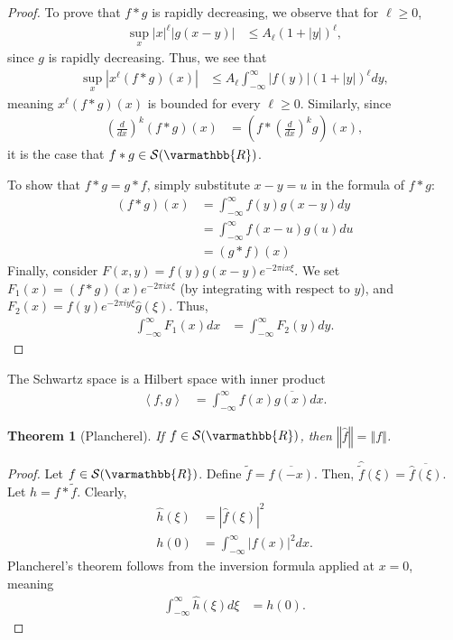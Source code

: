 \documentclass[12pt]{extarticle}
\newcommand{\R}{\varmathbb{R}}
\newcommand{\iprod}[2]{\left\langle #1,#2\right\rangle}
\newcommand{\norm}[1]{\left\Vert #1\right\Vert}
\theoremstyle{plain}
\newtheorem*{theorem}{Theorem}%
\theoremstyle{definition}
\theoremstyle{remark}
\renewcommand{\newline}{\hfill\break}
\begin{document}
  \begin{proof}
  To prove that $f\ast g$ is rapidly decreasing, we observe that for $\ell \geq 0$,
  \begin{align*}
    \sup_{x}|x|^{\ell}|g(x-y)| &\leq A_{\ell}(1+|y|)^{\ell},
  \end{align*}
  since $g$ is rapidly decreasing. Thus, we see that
  \begin{align*}
    \sup_{x}\left\vert x^{\ell}(f\ast g)(x) \right\vert &\leq A_{\ell}\int_{-\infty}^{\infty}|f(y)|\left(1 + |y|\right)^{\ell}dy,
  \end{align*}
  meaning $x^{\ell}(f\ast g)(x)$ is bounded for every $\ell \geq 0$. Similarly, since
  \begin{align*}
    \left(\frac{d}{dx}\right)^k \left(f\ast g\right)(x) &= \left(f\ast \left(\frac{d}{dx}\right)^{k}g\right)(x),
  \end{align*}
  it is the case that $f\ast g \in \mathcal{S}(\R)$. \newline

  To show that $f\ast g = g\ast f$, simply substitute $x - y = u$ in the formula of $f\ast g$:
  \begin{align*}
    \left(f\ast g\right)(x) &= \int_{-\infty}^{\infty}f(y)g(x-y)dy\\
               &= \int_{-\infty}^{\infty}f(x-u)g(u)du\\
               &= \left(g\ast f\right)(x)
  \end{align*}
  Finally, consider $F(x,y) = f(y)g(x-y)e^{-2\pi i x \xi}$. We set $F_1(x) = (f\ast g)(x)e^{-2\pi i x \xi}$ (by integrating with respect to $y$), and $F_2(x) = f(y)e^{-2\pi i y \xi}\hat{g}(\xi)$. Thus,
  \begin{align*}
    \int_{-\infty}^{\infty}F_1(x)dx &= \int_{-\infty}^{\infty}F_2(y)dy.
  \end{align*}
  \end{proof}
  The Schwartz space is a Hilbert space with inner product
  \begin{align*}
    \iprod{f}{g} &= \int_{-\infty}^{\infty}f(x)\overline{g(x)} dx.
  \end{align*}
  \begin{theorem}[Plancherel]
    If $f\in \mathcal{S}(\R)$, then $\norm{\hat{f}} = \norm{f}$.
  \end{theorem}
  \begin{proof}
    Let $f\in \mathcal{S}(\R)$. Define $\tilde{f} = \overline{f(-x)}$. Then, $\widehat{\tilde{f}}(\xi) = \overline{\hat{f}(\xi)}$. Let $h = f\ast \tilde{f}$. Clearly,
    \begin{align*}
      \hat{h}(\xi) &= \left\vert \hat{f}(\xi) \right\vert^2\\
      h(0) &= \int_{-\infty}^{\infty}|f(x)|^2dx.
    \end{align*}
    Plancherel's theorem follows from the inversion formula applied at $x=0$, meaning
    \begin{align*}
      \int_{-\infty}^{\infty}\hat{h}(\xi)d\xi &= h(0).
    \end{align*}
  \end{proof}
\end{document}
